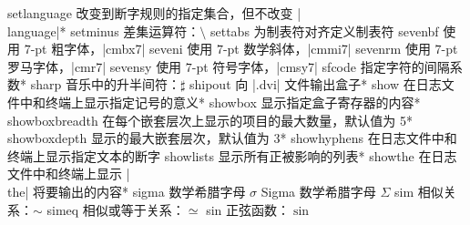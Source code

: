 \capcs setlanguage {改变到断字规则的指定集合，但不改变 |\\language|}{*}{}
\capcs setminus {差集运算符：$\setminus$}{}{}
\capcs settabs {为制表符对齐定义制表符}{}{}
\capcs sevenbf {使用 $7$-pt 粗字体，|cmbx7|}{}{}
\capcs seveni {使用 $7$-pt 数学斜体，|cmmi7|}{}{}
\capcs sevenrm {使用 $7$-pt 罗马字体，|cmr7|}{}{}
\capcs sevensy {使用 $7$-pt 符号字体，|cmsy7|}{}{}
\capcs sfcode {指定字符的间隔系数}*{}
\capcs sharp {音乐中的升半间符：$\sharp$}{}{}
\capcs shipout {向 |.dvi| 文件输出盒子}*{}
\capcs show {在日志文件中和终端上显示指定记号的意义}*{}
\capcs showbox {显示指定盒子寄存器的内容}*{}
\capcs showboxbreadth {在每个嵌套层次上显示的项目的最大数量，默认值为 5}*{}
\capcs showboxdepth {显示的最大嵌套层次，默认值为 3}*{}
\capcs showhyphens {在日志文件中和终端上显示指定文本的断字}{}{}
\capcs showlists {显示所有正被影响的列表}*{}
\capcs showthe {在日志文件中和终端上显示 |\\the| 将要输出的内容}*{}
\capcs sigma {数学希腊字母 $\sigma$}{}{}
\capcs Sigma {数学希腊字母 $\Sigma$}{}{}
\capcs sim {相似关系：$\sim$}{}{}
\capcs simeq {相似或等于关系：$\simeq$}{}{}
\capcs sin {正弦函数：$\sin$}{}{}
